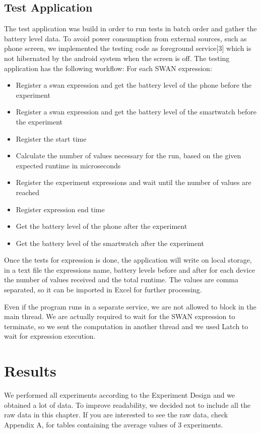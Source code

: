 \subsection{Test Application}
The test application was build in order to run tests in batch order and gather the battery level data. To avoid power consumption from external sources, such as phone screen, we implemented the testing code as foreground service[3] which is not hibernated by the android system when the screen is off. 
The testing application has the following workflow:
For each SWAN expression:
\begin{itemize}
 \item Register a swan expression and get the battery level of the phone before the experiment
 \item Register a swan expression and get the battery level of the smartwatch before the experiment
 \item Register the start time
 \item Calculate the number of values necessary for the run, based on the given expected runtime in microseconds
 \item Register the experiment expressions and wait until the number of values are reached
 \item Register expression end time
 \item Get the battery level of the phone after the experiment
 \item Get the battery level of the smartwatch after the experiment
\end{itemize}


Once the tests for expression is done, the application will write on local storage, in a text file the expressions name,
battery levels before and after for each device the number of values received and the total runtime.
 The values are comma separated, so it can be imported in Excel for further processing.

Even if the program runs in a separate service, we are not allowed to block in the main thread. 
We are actually required to wait for the SWAN expression to terminate, so we sent the computation in another thread and we used Latch to wait for expression execution.

 \section{Results}

We performed all experiments according to the Experiment Design and we obtained a lot of data. To improve readability,
we decided not to include all the raw data in this chapter. If you are interested to see the raw data, check Appendix A, for tables containing the
average values of 3 experiments.

